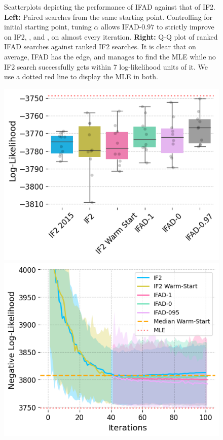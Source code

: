 \documentclass[9pt,twocolumn,twoside]{pnas-new}
\begin{document}
\begin{figure}[htbp!]
    \caption{Scatterplots depicting the performance of IFAD against that of IF2. \textbf{Left:} Paired searches from the same starting point. Controlling for initial starting point, tuning $\alpha$ allows IFAD-$0.97$ to strictly improve on IF2, \cite{poyiadjis11}, and \cite{blei2018vsmc}, on almost every iteration. \textbf{Right:} Q-Q plot of ranked IFAD searches against ranked IF2 searches. It is clear that on average, IFAD has the edge, and manages to find the MLE while no IF2 search successfully gets within 7 log-likelihood units of it. We use a dotted red line to display the MLE in both. }
    \label{fig:scatter-optim}
\end{figure}


\begin{figure}[ht]
    \includegraphics[width=\textwidth/\real{4.2}]{../imgs/095/boxplot.png}
    \includegraphics[width=\textwidth/\real{4.2}]{../imgs/095/optim.png}

\end{figure}
\end{document}
